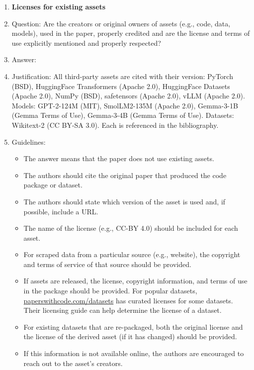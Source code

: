 \begin{enumerate}
\item {\bf Licenses for existing assets}
    \item[] Question: Are the creators or original owners of assets (e.g., code, data, models), used in the paper, properly credited and are the license and terms of use explicitly mentioned and properly respected?
    \item[] Answer: \answerYes{} %
    \item[] Justification: All third-party assets are cited with their version: PyTorch (BSD), HuggingFace Transformers (Apache 2.0), HuggingFace Datasets (Apache 2.0), NumPy (BSD), safetensors (Apache 2.0), vLLM (Apache 2.0). Models: GPT-2-124M (MIT), SmolLM2-135M (Apache 2.0), Gemma-3-1B (Gemma Terms of Use), Gemma-3-4B (Gemma Terms of Use). Datasets: Wikitext-2 (CC BY-SA 3.0). Each is referenced in the bibliography.
    \item[] Guidelines:
    \begin{itemize}
        \item The answer \answerNA{} means that the paper does not use existing assets.
        \item The authors should cite the original paper that produced the code package or dataset.
        \item The authors should state which version of the asset is used and, if possible, include a URL.
        \item The name of the license (e.g., CC-BY 4.0) should be included for each asset.
        \item For scraped data from a particular source (e.g., website), the copyright and terms of service of that source should be provided.
        \item If assets are released, the license, copyright information, and terms of use in the package should be provided. For popular datasets, \url{paperswithcode.com/datasets} has curated licenses for some datasets. Their licensing guide can help determine the license of a dataset.
        \item For existing datasets that are re-packaged, both the original license and the license of the derived asset (if it has changed) should be provided.
        \item If this information is not available online, the authors are encouraged to reach out to the asset's creators.
    \end{itemize}


\end{enumerate}
